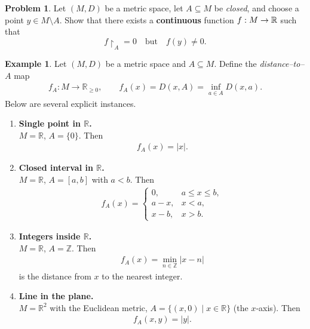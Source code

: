 \documentclass[12pt]{article}
\theoremstyle{definition} %
\newtheorem{problem}{Problem}
\newtheorem{example}{Example}
\theoremstyle{plain} %
\begin{document}
\begin{problem}
  Let $(M,D)$ be a metric space, let $A\subseteq M$ be \emph{closed},
  and choose a point $y\in M\setminus A$.  
  Show that there exists a \textbf{continuous}
  function $f:M\to\Bbb R$ such that
  \[
      f\!\restriction_{A}=0
      \quad\text{but}\quad 
      f(y)\neq 0 .
  \]
\end{problem}
\begin{example}
  Let $(M,D)$ be a metric space and $A\subseteq M$.  
  Define the \emph{distance–to–$A$} map
  \begin{align}
      f_A:M\longrightarrow\mathbb R_{\ge 0},\qquad 
      f_A(x)=D(x,A)=\inf_{a\in A} D(x,a).
  \end{align}
  Below are several explicit instances.

  \begin{enumerate}
      \item \textbf{Single point in $\mathbb R$.}\\
            $M=\mathbb R$, $A=\{0\}$.  Then
            \begin{align}
                f_A(x)=|x|.
            \end{align}

      \item \textbf{Closed interval in $\mathbb R$.}\\
            $M=\mathbb R$, $A=[a,b]$ with $a<b$.  Then
            \begin{align}
                f_A(x)=
                \begin{cases}
                    0,     & a\le x\le b,\\[4pt]
                    a-x,   & x<a,\\[4pt]
                    x-b,   & x>b.
                \end{cases}
            \end{align}

      \item \textbf{Integers inside $\mathbb R$.}\\
            $M=\mathbb R$, $A=\mathbb Z$.  Then
            \begin{align}
                f_A(x)=\min_{n\in\mathbb Z}|x-n|
            \end{align}
            is the distance from $x$ to the nearest integer.

      \item \textbf{Line in the plane.}\\
            $M=\mathbb R^{2}$ with the Euclidean metric,  
            $A=\{(x,0)\mid x\in\mathbb R\}$ (the $x$‑axis).  Then
            \begin{align}
                f_A(x,y)=|y|.
            \end{align}


\end{enumerate}
\end{example}
\end{document}

